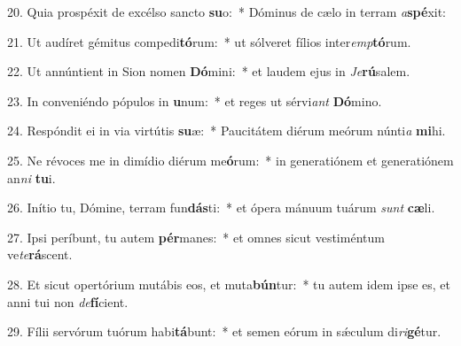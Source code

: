 20. Quia prospéxit de excélso sancto \textbf{su}o:~*  Dóminus de cælo in terram \textit{a}\textbf{spé}xit:\

21. Ut audíret gémitus compedi\textbf{tó}rum:~*  ut sólveret fílios inter\textit{emp}\textbf{tó}rum.\

22. Ut annúntient in Sion nomen \textbf{Dó}mini:~*  et laudem ejus in \textit{Je}\textbf{rú}salem.\

23. In conveniéndo pópulos in \textbf{u}num:~*  et reges ut sérvi\textit{ant} \textbf{Dó}mino.\

24. Respóndit ei in via virtútis \textbf{su}æ:~*  Paucitátem diérum meórum núnti\textit{a} \textbf{mi}hi.\

25. Ne révoces me in dimídio diérum me\textbf{ó}rum:~*  in generatiónem et generatiónem an\textit{ni} \textbf{tu}i.\

26. Inítio tu, Dómine, terram fun\textbf{dás}ti:~*  et ópera mánuum tuárum \textit{sunt} \textbf{cæ}li.\

27. Ipsi períbunt, tu autem \textbf{pér}manes:~*  et omnes sicut vestiméntum ve\textit{te}\textbf{rá}scent.\

28. Et sicut opertórium mutábis eos, et muta\textbf{bún}tur:~*  tu autem idem ipse es, et anni tui non \textit{de}\textbf{fí}cient.\

29. Fílii servórum tuórum habi\textbf{tá}bunt:~*  et semen eórum in sǽculum di\textit{ri}\textbf{gé}tur.\

